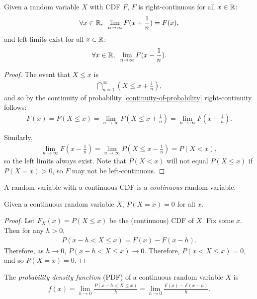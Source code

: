 \begin{prop}
    Given a random variable $X$ with CDF $F$, $F$ is right-continuous for all $x \in \mathbb{R}$:
    \[\forall x \in \mathbb{R},\;\;\lim_{n \to\infty}F(x + \frac{1}{n}) = F(x),\]
    and left-limits exist for all $x \in \mathbb{R}$:
    \[\forall x \in \mathbb{R},\;\;\lim_{n \to \infty}F(x - \frac{1}{n}).\]
\end{prop}

\begin{proof}
    The event that $X \leq x$ is
    \begin{align*}
        \bigcap_{n = 1}^{\infty}(X \leq x + \frac{1}{n}),
    \end{align*}
    and so by the continuity of probability \ref{continuity-of-probability} right-continuity follows:
    \begin{align*}
        F(x) = P(X \leq x) = \lim_{n \to \infty}P(X \leq x + \frac{1}{n}) = \lim_{n \to \infty}F(x + \frac{1}{n}).
    \end{align*}

    Similarly,
    \begin{align*}
        \lim_{n \to \infty}F(x - \frac{1}{n}) = \lim_{n \to \infty}P(X \leq x - \frac{1}{n}) = P(X < x),
    \end{align*}
    so the left limits always exist. Note that $P(X < x)$ will not equal $P(X \leq x)$ if $P(X = x) > 0$, so $F$ may not be left-continuous.
\end{proof}

\begin{defn}
    A random variable with a continuous CDF is a \emph{continuous} random variable.
\end{defn}

\begin{prop}
    Given a continuous random variable $X$, $P(X = x) = 0$ for all $x$.
\end{prop}

\begin{proof}
    Let $F_X(x) = P(X \leq x)$ be the (continuous) CDF of $X$. Fix some $x$. Then for any $h > 0$,
    \begin{align*}
        P(x-h < X \leq x) = F(x) - F(x - h).
    \end{align*}
    Therefore, as $h \to 0$, $P(x - h < X \leq x) \to 0$. Therefore, $P(x < X \leq x) = 0$, and so $P(X = x) = 0$.
\end{proof}

\begin{defn}
    The \emph{probability density function} (PDF) of a continuous random variable $X$ is
    \begin{align*}
        f(x) = \lim_{h \to 0}\frac{P(x - h < X \leq x)}{h} = \lim_{h \to 0}\frac{F(x) - F(x-h)}{h}.
    \end{align*}
\end{defn}

